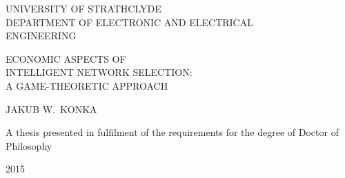 \begin{titlepage}

{\centering

{\sffamily\Large UNIVERSITY OF STRATHCLYDE}\\
{\sffamily\Large DEPARTMENT OF ELECTRONIC AND ELECTRICAL}\\
{\sffamily\Large ENGINEERING}

\vspace*{3cm}

{\sffamily\Huge ECONOMIC ASPECTS OF}\\[0.5em]
{\sffamily\Huge INTELLIGENT NETWORK SELECTION:}\\[0.5em]
{\sffamily\Huge A GAME-THEORETIC APPROACH}

\vspace{8cm}

{\sffamily\LARGE JAKUB W.~KONKA}

\par
\vspace{3cm}

{\sffamily\Large A thesis presented in fulfilment of the requirements for the degree of Doctor of Philosophy}

\par
\vspace{1cm}

{\sffamily\Large 2015}

}

\end{titlepage}